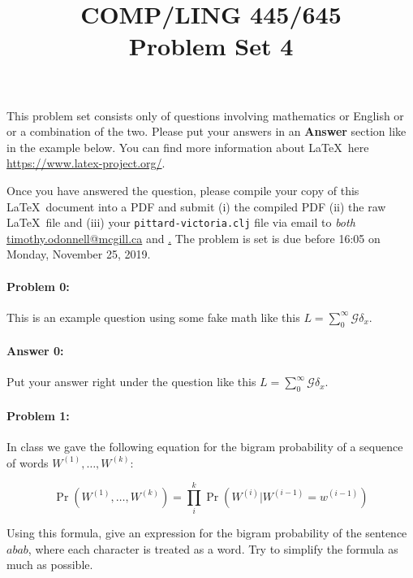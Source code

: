 \documentclass[10pt]{article}
\begin{document}
 
\title{COMP/LING 445/645\\Problem Set 4}
\date{}
\maketitle

This problem set consists only of questions involving mathematics or
English or or a combination of the two. Please put your answers in an
\textbf{Answer} section like in the example below. You can find more
information about \LaTeX\ here \url{https://www.latex-project.org/}.

Once you have answered the question, please compile your copy of this
\LaTeX\ document into a PDF and submit (i) the compiled PDF (ii) the
raw \LaTeX\ file and (iii) your \texttt{pittard-victoria.clj} file
via email to \emph{both}
\href{mailto:timothy.odonnell@mcgill.ca}{timothy.odonnell@mcgill.ca}
and
\href{mailto:savanna.willerton@mail.mcgill.ca}\href{savanna.willerton@mail.mcgill.ca}.
The problem is set is due before 16:05 on Monday, November 25, 2019.


\hrulefill
\paragraph{Problem 0:}
This is an example question using some fake math like this
$L=\sum_0^{\infty} \mathcal{G} \delta_x$.

\paragraph{Answer 0:} Put your answer right under the question like
this $L=\sum_0^{\infty} \mathcal{G} \delta_x$.

\hrulefill
\paragraph{Problem 1:}
 
In class we gave the following equation for the bigram probability of
a sequence of words $W^{(1)},\dots,W^{(k)}$:

\begin{equation}\label{eq:bigram}
\Pr(W^{(1)},\dots,W^{(k)})=\prod_i^k \Pr(W^{(i)} | W^{(i-1)}=w^{(i-1)})
\end{equation}

\noindent Using this formula, give an expression for the bigram
probability of the sentence $abab$, where each character is treated as
a word. Try to simplify the formula as much as possible.
\end{document}

